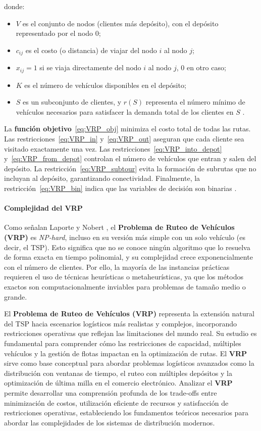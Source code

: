 \documentclass[12pt,titlepage,twoside,openright]{book}
\begin{document}
\noindent donde:
\begin{itemize}
    \item \(V\) es el conjunto de nodos (clientes más depósito), con el depósito representado por el nodo 0;
    \item \(c_{ij}\) es el costo (o distancia) de viajar del nodo \(i\) al nodo \(j\);
    \item \(x_{ij} = 1\) si se viaja directamente del nodo \(i\) al nodo \(j\), 0 en otro caso;
    \item \(K\) es el número de vehículos disponibles en el depósito;
    \item \(S\) es un subconjunto de clientes, y \(r(S)\) representa el número mínimo de vehículos necesarios para satisfacer la demanda total de los clientes en \(S\) \citep{toth2014}.
\end{itemize}

La \textbf{función objetivo}~\eqref{eq:VRP_obj} minimiza el costo total de todas las rutas. Las restricciones~\eqref{eq:VRP_in} y~\eqref{eq:VRP_out} aseguran que cada cliente sea visitado exactamente una vez. Las restricciones~\eqref{eq:VRP_into_depot} y~\eqref{eq:VRP_from_depot} controlan el número de vehículos que entran y salen del depósito. La restricción~\eqref{eq:VRP_subtour} evita la formación de subrutas que no incluyan al depósito, garantizando conectividad. Finalmente, la restricción~\eqref{eq:VRP_bin} indica que las variables de decisión son binarias \citep{toth2014}.


\paragraph{Complejidad del VRP}
\label{subsec:complejidad_vrp}

Como señalan Laporte y Nobert \cite{laporte1987}, el \textbf{Problema de Ruteo de Vehículos (VRP)} es \textit{NP-hard}, incluso en su versión más simple con un solo vehículo (es decir, el TSP). Esto significa que no se conoce ningún algoritmo que lo resuelva de forma exacta en tiempo polinomial, y su complejidad crece exponencialmente con el número de clientes. Por ello, la mayoría de las instancias prácticas requieren el uso de técnicas heurísticas o metaheurísticas, ya que los métodos exactos son computacionalmente inviables para problemas de tamaño medio o grande.

El \textbf{Problema de Ruteo de Vehículos (VRP)} representa la extensión natural del TSP hacia escenarios logísticos más realistas y complejos, incorporando restricciones operativas que reflejan las limitaciones del mundo real. Su estudio es fundamental para comprender cómo las restricciones de capacidad, múltiples vehículos y la gestión de flotas impactan en la optimización de rutas. El \textbf{VRP} sirve como base conceptual para abordar problemas logísticos avanzados como la distribución con ventanas de tiempo, el ruteo con múltiples depósitos y la optimización de última milla en el comercio electrónico. Analizar el \textbf{VRP} permite desarrollar una comprensión profunda de los trade-offs entre minimización de costos, utilización eficiente de recursos y satisfacción de restricciones operativas, estableciendo los fundamentos teóricos necesarios para abordar las complejidades de los sistemas de distribución modernos.
\end{document}
